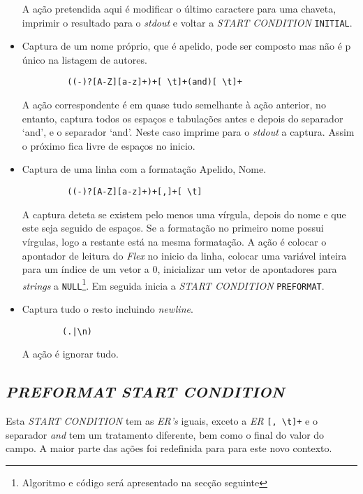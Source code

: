\begin{itemize}
	A ação pretendida aqui é modificar o último caractere para uma chaveta,
	imprimir o resultado para o \emph{stdout} e voltar a \emph{START CONDITION}
	\texttt{INITIAL}.

	 \item Captura de um nome próprio, que é apelido, pode ser composto
		      mas não é p único na listagem de autores.
    \begin{verbatim}
		 ((-)?[A-Z][a-z]+)+[ \t]+(and)[ \t]+
    \end{verbatim}

		A ação correspondente é em quase tudo semelhante à ação anterior, no
		entanto, captura todos os espaços e tabulações antes e depois do separador
		`and', e o separador `and'. Neste caso imprime para o \emph{stdout}
		a captura. Assim o próximo fica livre de espaços no inicio.


	 \item Captura de uma linha com a formatação Apelido, Nome.
    \begin{verbatim}
		 ((-)?[A-Z][a-z]+)+[,]+[ \t]
    \end{verbatim}
A captura deteta se existem pelo menos uma vírgula, depois do nome e que este
seja seguido de espaços. Se a formatação no primeiro nome possui vírgulas, logo
a restante está na mesma formatação. A ação é colocar o apontador de leitura do
\emph{Flex} no inicio da linha, colocar uma variável inteira para um índice de
um vetor a 0, inicializar um vetor de apontadores para \emph{strings} a 
\texttt{NULL}\footnote{Algoritmo e código será apresentado na secção seguinte}.
Em seguida inicia a \emph{START CONDITION} \texttt{PREFORMAT}.


	 \item Captura tudo o resto incluindo \emph{newline}.
    \begin{verbatim}
		(.|\n)
    \end{verbatim}
	A ação é ignorar tudo.


\end{itemize}




\subsection{\emph{PREFORMAT \emph{START CONDITION}}}

Esta \emph{START CONDITION} tem as \emph{ER's} iguais, exceto a \emph{ER} \verb|[, \t]+| e 
o separador \emph{and} tem um tratamento diferente, bem como o final do valor do
campo. A maior parte das ações foi redefinida para para este novo contexto.




